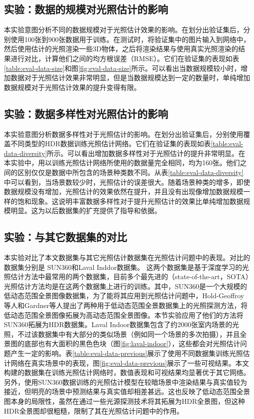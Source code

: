\subsection{实验：数据的规模对光照估计的影响}

本实验意图分析不同的数据规模对于光照估计效果的影响。在划分出验证集后，分别使用100张到900张数据用于训练。在测试时，将验证集中的图片输入到网络中，然后使用估计的光照渲染一些3D物体，之后将渲染结果与使用真实光照渲染的结果进行对比，计算他们之间的均方根误差（RMSE）。它们在验证集的表现如表\ref{table:eval-data-size}和图\ref{fig:eval-data-size}所示。可以看出当数据规模较小时，增加数据对于光照估计效果非常明显，但是当数据规模达到一定的数量时，单纯增加数据规模对于光照估计效果的提升变得有限。

\subsection{实验：数据多样性对光照估计的影响}

本实验意图分析数据多样性对于光照估计的影响。在划分出验证集后，分别使用覆盖不同类型的HDR数据训练光照估计网络。它们在验证集的表现如表\ref{table:eval-data-diversity}所示。可以看出增加数据多样性对于光照估计的提升非常明显。在本实验中，用以训练光照估计网络所使用的数据量完全相同，均为160张。他们之间的区别仅仅是数据中所包含的场景种类数不同。从表\ref{table:eval-data-diversity}中可以看到，当场景数较少时，光照估计的误差很大。随着场景种类的增多，即使数据规模没有增加，光照估计的效果依然在提升，并且没有出现像增加数据规模一样的饱和现象。这说明丰富数据多样性对于提升光照估计的效果比单纯增加数据规模明显。这为以后数据集的扩充提供了指导和依据。
\subsection{实验：与其它数据集的对比}

本实验对比了本文数据集与其它光照估计数据集在光照估计问题中的表现。对比的数据集分别是
SUN360\cite{xiao2012recognizing}和Laval Inddor\cite{gardner2017learning}数据集。
这两个数据集是基于深度学习的光照估计方法中最常用的两个数据集，目前多个最先进的（state-of-the-art，SOTA）光照估计方法均是在这两个数据集上进行的训练。其中，SUN360是一个大规模的低动态范围全景图像数据集，为了能将其应用到光照估计问题中，Hold-Geoffroy等人\cite{hold2017deep}和Gardner等人\cite{gardner2017learning}提出了两种用于低动态范围全景数据集上的光照探测方法，将低动态范围全景图像拓展为高动态范围全景图像。本节实验应用了他们的方法将SUN360拓展为HDR数据集。Laval Indoor数据集包含了约2000张室内场景的光照，不过该数据集中有大部分的类似场景（例如同一个场景的多次拍摄），并且全景图的底部也有大面积的黑色色块（图\ref{fig:laval-indoor}），这些都会对光照估计问题产生一定的影响。表\ref{table:eval-data-previous}展示了使用不同数据集训练光照估计网络在真实场景中的表现，图\ref{fig:eval-data-previous}展示了一些可视结果。本文构建的数据集在训练光照估计网络时，数值表现和可视结果均显著优于其它网络。另外，使用SUN360数据训练的光照估计模型在较暗场景中渲染结果与真实值较为接近，但明亮的场景中预测结果与真实值却相差甚远。这也反映了低动态范围全景图本身的局限性，虽然在通过一些光源探测技术将其拓展为HDR全景图，但这种HDR全景图却很粗糙，限制了其在光照估计问题中的作用。

